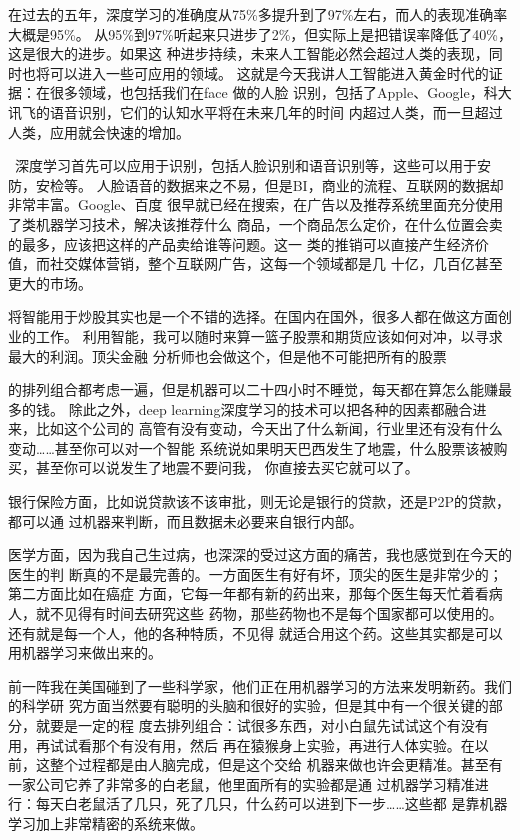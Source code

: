 \documentclass[11pt]{ctexart}
\begin{document}
{{{{在过去的五年，深度学习的准确度从75\%多提升到了97\%左右，而人的表现准确率大概是95\%。
从95\%到97\%听起来只进步了2\%，但实际上是把错误率降低了40\%，这是很大的进步。如果这
种进步持续，未来人工智能必然会超过人类的表现，同时也将可以进入一些可应用的领域。
这就是今天我讲人工智能进入黄金时代的证据：在很多领域，也包括我们在face 做的人脸
识别，包括了Apple、Google，科大讯飞的语音识别，它们的认知水平将在未来几年的时间
内超过人类，而一旦超过人类，应用就会快速的增加。


 深度学习首先可以应用于识别，包括人脸识别和语音识别等，这些可以用于安防，安检等。
人脸语音的数据来之不易，但是BI，商业的流程、互联网的数据却非常丰富。Google、百度
很早就已经在搜索，在广告以及推荐系统里面充分使用了类机器学习技术，解决该推荐什么
商品，一个商品怎么定价，在什么位置会卖的最多，应该把这样的产品卖给谁等问题。这一
类的推销可以直接产生经济价值，而社交媒体营销，整个互联网广告，这每一个领域都是几
十亿，几百亿甚至更大的市场。

将智能用于炒股其实也是一个不错的选择。在国内在国外，很多人都在做这方面创业的工作。
利用智能，我可以随时来算一篮子股票和期货应该如何对冲，以寻求最大的利润。顶尖金融
分析师也会做这个，但是他不可能把所有的股票

的排列组合都考虑一遍，但是机器可以二十四小时不睡觉，每天都在算怎么能赚最多的钱。
除此之外，deep learning深度学习的技术可以把各种的因素都融合进来，比如这个公司的
高管有没有变动，今天出了什么新闻，行业里还有没有什么变动……甚至你可以对一个智能
系统说如果明天巴西发生了地震，什么股票该被购买，甚至你可以说发生了地震不要问我，
你直接去买它就可以了。

银行保险方面，比如说贷款该不该审批，则无论是银行的贷款，还是P2P的贷款，都可以通
过机器来判断，而且数据未必要来自银行内部。

医学方面，因为我自己生过病，也深深的受过这方面的痛苦，我也感觉到在今天的医生的判
断真的不是最完善的。一方面医生有好有坏，顶尖的医生是非常少的；第二方面比如在癌症
方面，它每一年都有新的药出来，那每个医生每天忙着看病人，就不见得有时间去研究这些
药物，那些药物也不是每个国家都可以使用的。还有就是每一个人，他的各种特质，不见得
就适合用这个药。这些其实都是可以用机器学习来做出来的。

前一阵我在美国碰到了一些科学家，他们正在用机器学习的方法来发明新药。我们的科学研
究方面当然要有聪明的头脑和很好的实验，但是其中有一个很关键的部分，就要是一定的程
度去排列组合：试很多东西，对小白鼠先试试这个有没有用，再试试看那个有没有用，然后
再在猿猴身上实验，再进行人体实验。在以前，这整个过程都是由人脑完成，但是这个交给
机器来做也许会更精准。甚至有一家公司它养了非常多的白老鼠，他里面所有的实验都是通
过机器学习精准进行：每天白老鼠活了几只，死了几只，什么药可以进到下一步……这些都
是靠机器学习加上非常精密的系统来做。

}}}}
\end{document}
